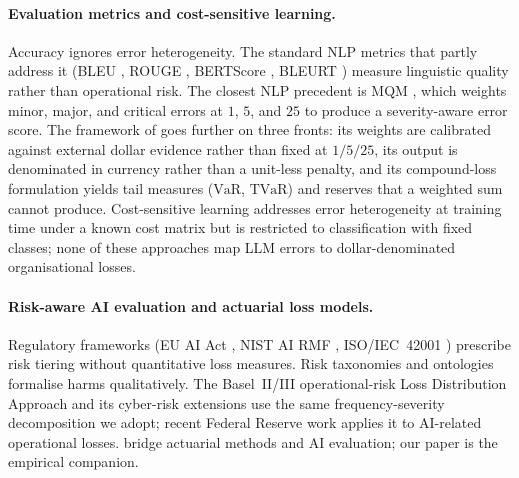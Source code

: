 \documentclass[11pt]{article}
\newcommand{\VaR}{\mathrm{VaR}}
\newcommand{\TVaR}{\mathrm{TVaR}}
\begin{document}
\paragraph{Evaluation metrics and cost-sensitive learning.}
Accuracy ignores error heterogeneity. The standard NLP metrics
that partly address it (BLEU \citep{papineni2002bleu}, ROUGE
\citep{lin2004rouge}, BERTScore \citep{zhang2020bertscore},
BLEURT \citep{sellam2020bleurt}) measure linguistic quality
rather than operational risk. The closest NLP precedent is MQM
\citep{lommel2014mqm}, which weights minor, major, and critical
errors at $1$, $5$, and $25$ to produce a severity-aware error
score. The framework of \citet{beauchemin2026position} goes
further on three fronts: its weights are calibrated against
external dollar evidence rather than fixed at $1/5/25$, its
output is denominated in currency rather than a unit-less
penalty, and its compound-loss formulation yields tail measures
($\VaR$, $\TVaR$) and reserves that a weighted sum cannot
produce. Cost-sensitive learning
\citep{elkan2001foundations,drummond2006cost,ling2008cost}
addresses error heterogeneity at training time under a known
cost matrix but is restricted to classification with fixed
classes; none of these approaches map LLM errors to
dollar-denominated organisational losses.

\paragraph{Risk-aware AI evaluation and actuarial loss models.}
Regulatory frameworks (EU AI Act \citep{euaiact2024}, NIST AI RMF
\citep{nist2023rmf}, ISO/IEC~42001 \citep{iso42001}) prescribe
risk tiering without quantitative loss measures. Risk taxonomies
\citep{weidinger2022taxonomy,bergman2024stela,kirk2024personalising}
and ontologies \citep{golpayegani2022airo} formalise harms
qualitatively. The Basel~II/III operational-risk Loss
Distribution Approach \citep{basel2006} and its cyber-risk
extensions \citep{malavasi2022cyber,eling2016cyber} use the same
frequency-severity decomposition we adopt; recent Federal Reserve
work \citep{bosfed2025ai} applies it to AI-related operational
losses. \citet{beauchemin2026position} bridge actuarial methods
and AI evaluation; our paper is the empirical companion.
\end{document}
